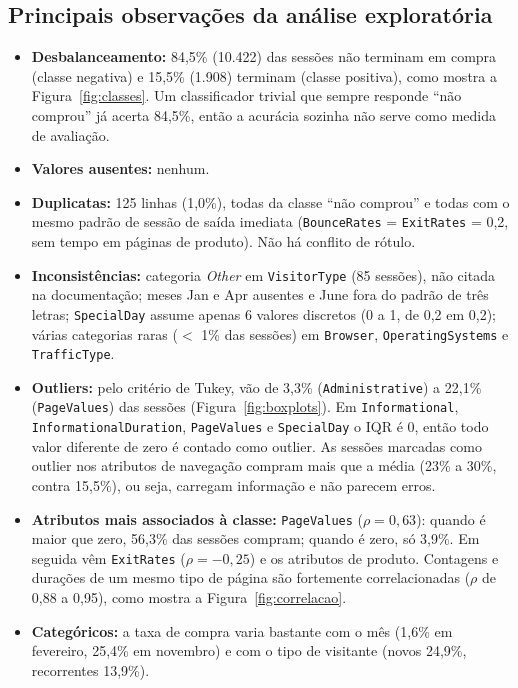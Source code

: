 \documentclass[11pt,a4paper]{article}
\DeclareRobustCommand{\atr}[1]{{\renewcommand{\_}{\textunderscore\allowbreak}\texttt{#1}}}
\begin{document}
\subsection*{Principais observações da análise exploratória}
\begin{itemize}
  \item \textbf{Desbalanceamento:} 84,5\% (10.422) das sessões não terminam em compra (classe negativa) e 15,5\%
        (1.908) terminam (classe positiva), como mostra a Figura~\ref{fig:classes}. Um classificador trivial que
        sempre responde ``não comprou'' já acerta 84,5\%, então a acurácia sozinha não serve como medida de
        avaliação.
  \item \textbf{Valores ausentes:} nenhum.
  \item \textbf{Duplicatas:} 125 linhas (1,0\%), todas da classe ``não comprou'' e todas com o mesmo padrão de sessão
        de saída imediata (\atr{BounceRates} = \atr{ExitRates} = 0,2, sem tempo em páginas de produto). Não há
        conflito de rótulo.
  \item \textbf{Inconsistências:} categoria \textit{Other} em \atr{VisitorType} (85 sessões), não citada na
        documentação; meses Jan e Apr ausentes e June fora do padrão de três letras; \atr{SpecialDay} assume apenas 6
        valores discretos (0 a 1, de 0,2 em 0,2); várias categorias raras ($<$ 1\% das sessões) em \atr{Browser},
        \atr{OperatingSystems} e \atr{TrafficType}.
  \item \textbf{Outliers:} pelo critério de Tukey, vão de 3,3\% (\atr{Administrative}) a 22,1\% (\atr{PageValues})
        das sessões (Figura~\ref{fig:boxplots}). Em \atr{Informational}, \atr{Informational\_Duration},
        \atr{PageValues} e \atr{SpecialDay} o IQR é 0, então todo valor diferente de zero é contado como outlier. As
        sessões marcadas como outlier nos atributos de navegação compram mais que a média (23\% a 30\%, contra
        15,5\%), ou seja, carregam informação e não parecem erros.
  \item \textbf{Atributos mais associados à classe:} \atr{PageValues} ($\rho = 0{,}63$): quando é maior que zero,
        56,3\% das sessões compram; quando é zero, só 3,9\%. Em seguida vêm \atr{ExitRates} ($\rho = -0{,}25$) e os
        atributos de produto. Contagens e durações de um mesmo tipo de página são fortemente correlacionadas ($\rho$
        de 0,88 a 0,95), como mostra a Figura~\ref{fig:correlacao}.
  \item \textbf{Categóricos:} a taxa de compra varia bastante com o mês (1,6\% em fevereiro, 25,4\% em novembro) e
        com o tipo de visitante (novos 24,9\%, recorrentes 13,9\%).
\end{itemize}
\end{document}
